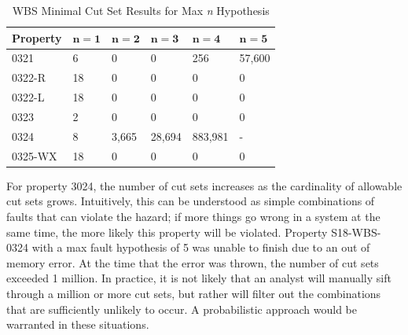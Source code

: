 \begin{table}[htbp]
\begin{center}
    \begin{tabular}{ | l | l | l | l | l | l |}
    \hline
    \textbf{Property} & $\bm{n = 1}$ & $\bm{n = 2}$ & $\bm{n = 3}$ & $\bm{n = 4}$ 
		& $\bm{n = 5}$    \\ \hline \hline
    0321 & 6 & 0 & 0 & 256 & 57,600   \\ \hline
    0322-R & 18 & 0 & 0 & 0 & 0  \\ \hline
    0322-L & 18 & 0 & 0 & 0 & 0  \\ \hline
    0323 & 2 & 0 & 0 & 0 & 0  \\ \hline
    0324 & 8 & 3,665 & 28,694 & 883,981 & - \\ \hline
    0325-WX & 18 & 0 & 0 &0 &0 \\ \hline
    \end{tabular}
    \caption{WBS Minimal Cut Set Results for Max \textit{n} Hypothesis}
    \label{tab:wbs_maxN_results1}
    \end{center}
\end{table}


For property 3024, the number of cut sets increases as the cardinality of allowable cut sets grows. Intuitively, this can be understood as simple combinations of faults that can violate the hazard; if more things go wrong in a system at the same time, the more likely this property will be violated. Property S18-WBS-0324 with a max fault hypothesis of 5 was unable to finish due to an out of memory error. At the time that the error was thrown, the number of cut sets exceeded 1 million. In practice, it is not likely that an analyst will manually sift through a million or more cut sets, but rather will filter out the combinations that are sufficiently unlikely to occur. A probabilistic approach would be warranted in these situations. 

